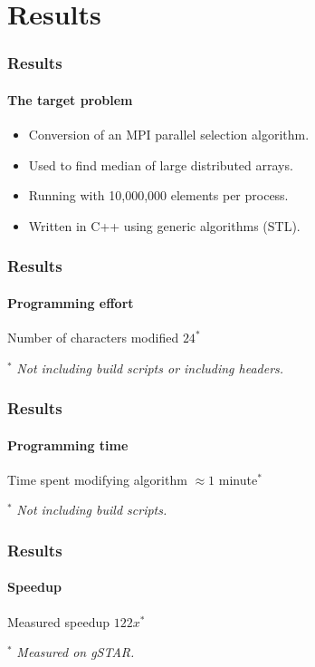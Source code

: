 \documentclass{beamer}
\begin{document}
\section{Results}

\begin{frame}
  \frametitle{Results}
  \framesubtitle{The target problem}
  \begin{itemize}
    \item Conversion of an MPI parallel selection algorithm.
    \item Used to find median of large distributed arrays.
    \item Running with 10,000,000 elements per process.
    \item Written in C++ using generic algorithms (STL).
  \end{itemize}
\end{frame}

\begin{frame}
  \frametitle{Results}
  \framesubtitle{Programming effort}
  \begin{block}{Number of characters modified}
    \centering
    \vspace{1cm}
    {\Huge $24^*$}
    \vspace{1cm}
  \end{block}
  $^*$ {\it Not including build scripts or including headers.}
\end{frame}

\begin{frame}
  \frametitle{Results}
  \framesubtitle{Programming time}
  \begin{block}{Time spent modifying algorithm}
    \centering
    \vspace{1cm}
    {\Huge $\approx 1$ minute$^*$}
    \vspace{1cm}
  \end{block}
  $^*$ {\it Not including build scripts.}
\end{frame}

\begin{frame}
  \frametitle{Results}
  \framesubtitle{Speedup}
  \begin{block}{Measured speedup}
    \centering
    \vspace{1cm}
    {\Huge $122x^*$}
    \vspace{1cm}
  \end{block}
  $^*$ {\it Measured on gSTAR.}
\end{frame}
\end{document}
